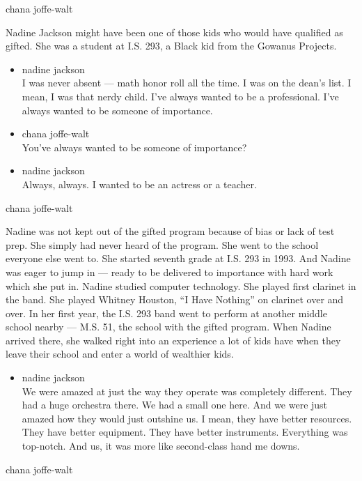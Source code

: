 chana joffe-walt

Nadine Jackson might have been one of those kids who would have
qualified as gifted. She was a student at I.S. 293, a Black kid from the
Gowanus Projects.

\begin{itemize}
\item
  nadine jackson\\
  I was never absent --- math honor roll all the time. I was on the
  dean's list. I mean, I was that nerdy child. I've always wanted to be
  a professional. I've always wanted to be someone of importance.
\item
  chana joffe-walt\\
  You've always wanted to be someone of importance?
\item
  nadine jackson\\
  Always, always. I wanted to be an actress or a teacher.
\end{itemize}

chana joffe-walt

Nadine was not kept out of the gifted program because of bias or lack of
test prep. She simply had never heard of the program. She went to the
school everyone else went to. She started seventh grade at I.S. 293 in
1993. And Nadine was eager to jump in --- ready to be delivered to
importance with hard work which she put in. Nadine studied computer
technology. She played first clarinet in the band. She played Whitney
Houston, ``I Have Nothing'' on clarinet over and over. In her first
year, the I.S. 293 band went to perform at another middle school nearby
--- M.S. 51, the school with the gifted program. When Nadine arrived
there, she walked right into an experience a lot of kids have when they
leave their school and enter a world of wealthier kids.

\begin{itemize}
\tightlist
\item
  nadine jackson\\
  We were amazed at just the way they operate was completely different.
  They had a huge orchestra there. We had a small one here. And we were
  just amazed how they would just outshine us. I mean, they have better
  resources. They have better equipment. They have better instruments.
  Everything was top-notch. And us, it was more like second-class hand
  me downs.
\end{itemize}

chana joffe-walt

